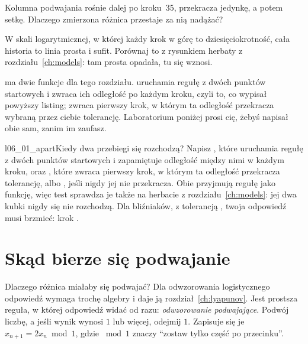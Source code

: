 \begin{think}
Kolumna podwajania rośnie dalej po kroku~35, przekracza jedynkę, a potem
setkę. Dlaczego zmierzona różnica przestaje za nią nadążać?
\end{think}
W skali logarytmicznej, w której każdy krok w górę to dziesięciokrotność,
cała historia to linia prosta i sufit. Porównaj to z rysunkiem herbaty z
rozdziału~\ref{ch:models}: tam prosta opadała, tu się wznosi.


\begin{projectbox}
 ma dwie funkcje dla tego rozdziału. 
uruchamia regułę z dwóch punktów startowych i zwraca ich odległość po każdym
kroku, czyli to, co wypisał powyższy listing; 
zwraca pierwszy krok, w którym ta odległość przekracza wybraną przez ciebie
tolerancję. Laboratorium poniżej prosi cię, żebyś napisał obie sam, zanim im
zaufasz.
\end{projectbox}

\begin{lab}{l06_01_apart}{Kiedy dwa przebiegi się rozchodzą?}
Napisz , które uruchamia regułę z dwóch punktów startowych i
zapamiętuje odległość między nimi w każdym kroku, oraz ,
które zwraca pierwszy krok, w którym ta odległość przekracza tolerancję,
albo , jeśli nigdy jej nie przekracza. Obie przyjmują regułę jako
funkcję, więc test sprawdza je także na herbacie
z rozdziału~\ref{ch:models}: jej dwa kubki nigdy się nie rozchodzą. Dla
bliźniaków, z tolerancją , twoja odpowiedź musi brzmieć: krok
.
\end{lab}

\section{Skąd bierze się podwajanie}
\label{sec:ch06-digits}

\noindent
Dlaczego różnica miałaby się podwajać? Dla odwzorowania logistycznego
odpowiedź wymaga trochę algebry i daje ją rozdział~\ref{ch:lyapunov}. Jest
prostsza reguła, w której odpowiedź widać od razu: \emph{odwzorowanie
podwajające}. Podwój liczbę, a jeśli wynik wynosi $1$ lub więcej, odejmij
$1$. Zapisuje się je $x_{n+1} = 2x_n \bmod 1$, gdzie $\bmod 1$ znaczy
\enquote{zostaw tylko część po przecinku}.

